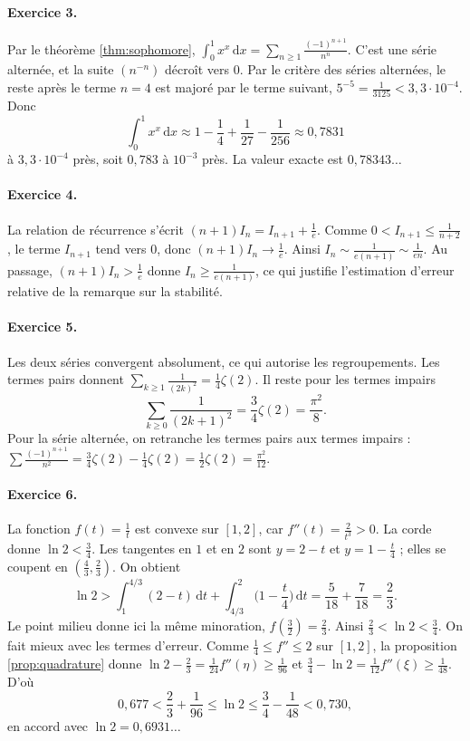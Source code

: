 \documentclass[11pt,a4paper]{article}
\theoremstyle{plain}
\theoremstyle{definition}
\theoremstyle{remark}
\newcommand{\dd}{\,\mathrm{d}}
\begin{document}
\paragraph{Exercice 3.} Par le théorème \ref{thm:sophomore}, $\int_0^1x^x\dd x=\sum_{n\geq1}\frac{(-1)^{n+1}}{n^n}$. C'est une série alternée, et la suite $(n^{-n})$ décroît vers $0$. Par le critère des séries alternées, le reste après le terme $n=4$ est majoré par le terme suivant, $5^{-5}=\frac1{3125}<3{,}3\cdot10^{-4}$. Donc
\[
  \int_0^1x^x\dd x\approx1-\frac14+\frac1{27}-\frac1{256}\approx0{,}7831
\]
à $3{,}3\cdot10^{-4}$ près, soit $0{,}783$ à $10^{-3}$ près. La valeur exacte est $0{,}78343\ldots$

\paragraph{Exercice 4.} La relation de récurrence s'écrit $(n+1)I_n=I_{n+1}+\frac1e$. Comme $0<I_{n+1}\leq\frac1{n+2}$, le terme $I_{n+1}$ tend vers $0$, donc $(n+1)I_n\to\frac1e$. Ainsi $I_n\sim\frac1{e(n+1)}\sim\frac1{en}$. Au passage, $(n+1)I_n>\frac1e$ donne $I_n\geq\frac1{e(n+1)}$, ce qui justifie l'estimation d'erreur relative de la remarque sur la stabilité.

\paragraph{Exercice 5.} Les deux séries convergent absolument, ce qui autorise les regroupements. Les termes pairs donnent $\sum_{k\geq1}\frac1{(2k)^2}=\frac14\zeta(2)$. Il reste pour les termes impairs
\[
  \sum_{k\geq0}\frac1{(2k+1)^2}=\frac34\zeta(2)=\frac{\pi^2}8 .
\]
Pour la série alternée, on retranche les termes pairs aux termes impairs : $\sum\frac{(-1)^{n+1}}{n^2}=\frac34\zeta(2)-\frac14\zeta(2)=\frac12\zeta(2)=\frac{\pi^2}{12}$.

\paragraph{Exercice 6.} La fonction $f(t)=\frac1t$ est convexe sur $[1,2]$, car $f''(t)=\frac2{t^3}>0$. La corde donne $\ln2<\frac34$. Les tangentes en $1$ et en $2$ sont $y=2-t$ et $y=1-\frac t4$ ; elles se coupent en $(\frac43,\frac23)$. On obtient
\[
  \ln2>\int_1^{4/3}(2-t)\dd t+\int_{4/3}^2\Big(1-\frac t4\Big)\dd t=\frac5{18}+\frac7{18}=\frac23 .
\]
Le point milieu donne ici la même minoration, $f(\frac32)=\frac23$. Ainsi $\frac23<\ln2<\frac34$. On fait mieux avec les termes d'erreur. Comme $\frac14\leq f''\leq2$ sur $[1,2]$, la proposition \ref{prop:quadrature} donne $\ln2-\frac23=\frac{1}{24}f''(\eta)\geq\frac1{96}$ et $\frac34-\ln2=\frac1{12}f''(\xi)\geq\frac{1}{48}$. D'où
\[
  0{,}677<\frac23+\frac1{96}\leq\ln2\leq\frac34-\frac1{48}<0{,}730,
\]
en accord avec $\ln2=0{,}6931\ldots$
\end{document}
